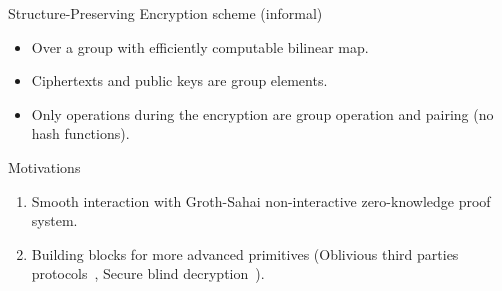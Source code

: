 \begin{frame}
  \begin{block}{Structure-Preserving Encryption scheme (informal)}
    \pause
    \begin{itemize}
    \item Over a group with efficiently computable bilinear map.
      \pause
    \item Ciphertexts and public keys are group elements.
      \pause
    \item Only operations during the encryption are group operation and pairing (\eg no hash functions).
    \end{itemize}
  \end{block}

  \pause
  
  \begin{block}{Motivations}
    \begin{enumerate}
    \item Smooth interaction with Groth-Sahai non-interactive zero-knowledge proof system.
      \pause
    \item Building blocks for more advanced primitives (\eg Oblivious third parties protocols~\cite{DBLP:conf/dim/CamenischGH08}, Secure blind decryption~\cite{DBLP:conf/pkc/Green11}).
      \pause
    \end{enumerate}
  \end{block}
\end{frame}


